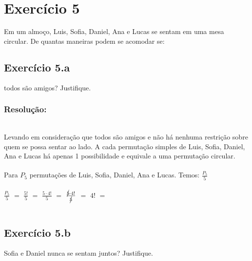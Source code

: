 \documentclass[12pt,a4paper]{article}
\newcommand\tab[1][1cm]{\hspace*{#1}}
\begin{document}
\section{Exercício 5}

Em um almoço, Luis, Sofia, Daniel, Ana e Lucas se sentam em uma mesa circular. De quantas maneiras podem se acomodar se:

\subsection{Exercício 5.a}

todos são amigos? Justifique.

\subsubsection{Resolução:}
\begin{center}
\end{center}
\\
    \renewcommand{\cancelColor}{\color{red}}
\tab Levando em consideração que todos são amigos e não há nenhuma restrição sobre quem se possa sentar ao lado. A cada permutação simples de Luis, Sofia, Daniel, Ana e Lucas há apenas 1 possibilidade e equivale a uma permutação circular.\\\\
Para $P_{5}$ permutações de Luis, Sofia, Daniel, Ana e Lucas. Temos:   \LARGE$\frac{P_{5}}{5}$\\\\
$\frac{P_{5}}{5}$ \normalsize{$=$} \Large$\frac{5!}{5}$ \normalsize{$=$} \Large$\frac{5\cdot4!}{5}$ \normalsize{$=$} \renewcommand{\CancelColor}{\color{red}} \Large$\frac{{\cancel{5}}\cdot4!}{\cancel{5}}$ \normalsize{$=$} \normalsize $4!$ $=$\\\\
\newpage
\normalsize
\subsection{Exercício 5.b}

{Sofia e Daniel nunca se sentam juntos? Justifique.}
\end{document}
